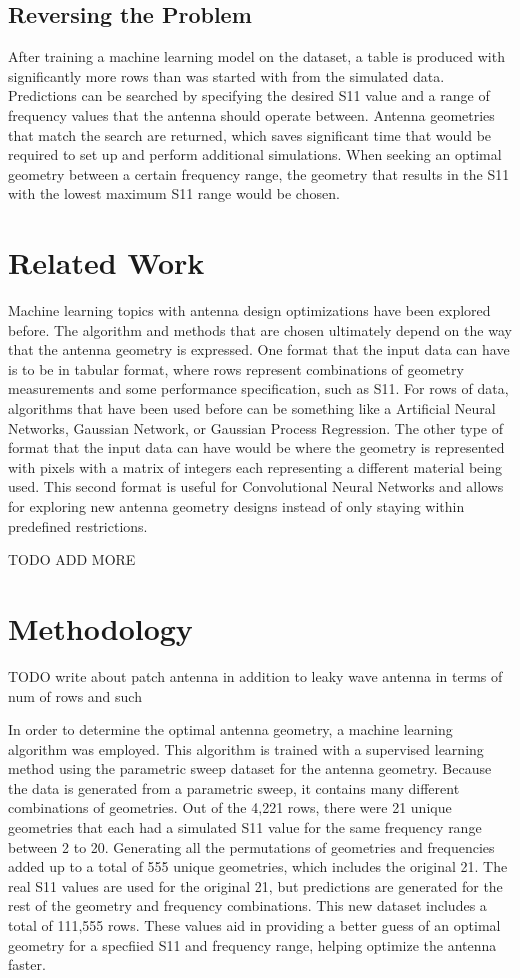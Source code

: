 \documentclass[lettersize,journal]{IEEEtran}
\begin{document}
\subsection{Reversing the Problem}
After training a machine learning model on the dataset, a table is produced with significantly more rows than was started with from the simulated data. Predictions can be searched by specifying the desired S11 value and a range of frequency values that the antenna should operate between. Antenna geometries that match the search are returned, which saves significant time that would be required to set up and perform additional simulations. When seeking an optimal geometry between a certain frequency range, the geometry that results in the S11 with the lowest maximum S11 range would be chosen.


\section{Related Work}
Machine learning topics with antenna design optimizations have been explored before. The algorithm and methods that are chosen ultimately depend on the way that the antenna geometry is expressed. One format that the input data can have is to be in tabular format, where rows represent combinations of geometry measurements and some performance specification, such as S11. For rows of data, algorithms that have been used before can be something like a Artificial Neural Networks, Gaussian Network, or Gaussian Process Regression. The other type of format that the input data can have would be where the geometry is represented with pixels with a matrix of integers each representing a different material being used. This second format is useful for Convolutional Neural Networks and allows for exploring new antenna geometry designs instead of only staying within predefined restrictions.~\cite{wu_machine_2023} 

TODO ADD MORE 


\section{Methodology}
TODO write about patch antenna in addition to leaky wave antenna in terms of num of rows and such 

In order to determine the optimal antenna geometry, a machine learning algorithm was employed. This algorithm is trained with a supervised learning method using the parametric sweep dataset for the antenna geometry. Because the data is generated from a parametric sweep, it contains many different combinations of geometries. Out of the 4,221 rows, there were 21 unique geometries that each had a simulated S11 value for the same frequency range between 2 to 20. Generating all the permutations of geometries and frequencies added up to a total of 555 unique geometries, which includes the original 21. The real S11 values are used for the original 21, but predictions are generated for the rest of the geometry and frequency combinations. This new dataset includes a total of 111,555 rows. These values aid in providing a better guess of an optimal geometry for a specfiied S11 and frequency range, helping optimize the antenna faster. 
\end{document}
